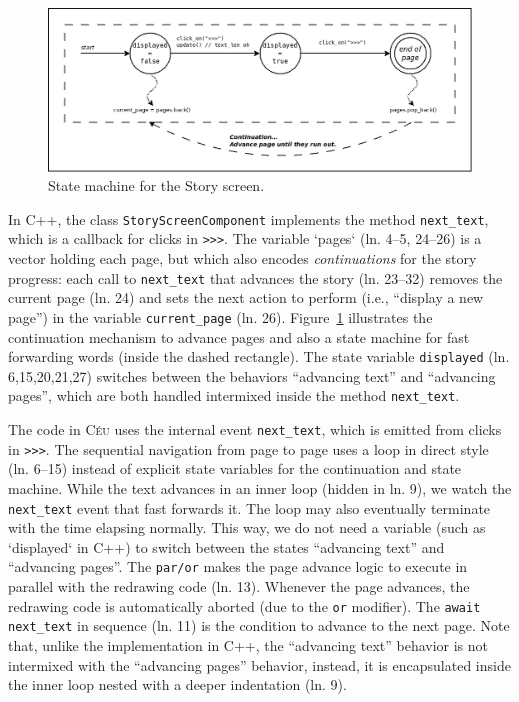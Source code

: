 \documentclass{vgtc}                          %
\newcommand{\CEU}{\textsc{C\'{e}u}\xspace}
\newcommand{\code}[1] {{\small{\texttt{#1}}}}
\begin{document}
\begin{figure}
\centering
\includegraphics[width=\columnwidth]{story}
\caption{State machine for the Story screen.
\label{fig.story}
}
\end{figure}

In C++, the class \code{StoryScreenComponent} implements the method
\code{next\_text}, which is a callback for clicks in \code{>>>}.
%
The variable `pages` (ln. 4--5, 24--26) is a vector holding each page, but
which also encodes \emph{continuations} for the story progress:
each call to \code{next\_text} that advances the story (ln. 23--32) removes the 
current page (ln. 24) and sets the next action to perform (i.e., ``display a
new page'') in the variable \code{current\_page} (ln. 26).
Figure~\ref{fig.story} illustrates the continuation mechanism to advance 
pages and also a state machine for fast forwarding words (inside the dashed
rectangle).
The state variable \code{displayed} (ln. 6,15,20,21,27) switches between the
behaviors ``advancing text'' and ``advancing pages'', which are both handled
intermixed inside the method \code{next\_text}.

The code in \CEU uses the internal event \code{next\_text}, which is emitted
from clicks in \code{>>>}.
%
The sequential navigation from page to page uses a loop in direct style
(ln. 6--15) instead of explicit state variables for the continuation and state
machine.
While the text advances in an inner loop (hidden in ln. 9), we watch the
\code{next\_text} event that fast forwards it.
The loop may also eventually terminate with the time elapsing normally.
This way, we do not need a variable (such as `displayed` in C++) to switch 
between the states ``advancing text'' and ``advancing pages''.
The \code{par/or} makes the page advance logic to execute in parallel with the
redrawing code (ln. 13).
Whenever the page advances, the redrawing code is automatically aborted
(due to the \code{or} modifier).
The \code{await next\_text} in sequence (ln. 11) is the condition to advance to
the next page.
%
Note that, unlike the implementation in C++, the ``advancing text'' behavior is
not intermixed with the ``advancing pages'' behavior, instead, it is
encapsulated inside the inner loop nested with a deeper indentation (ln. 9).
\end{document}
